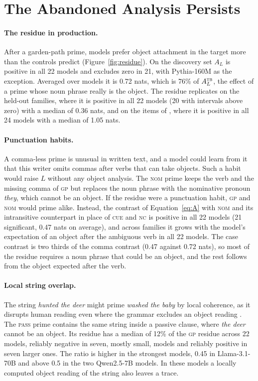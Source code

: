 \documentclass[11pt]{article}
\newcommand{\ex}[1]{\textit{#1}}
\newcommand{\cond}[1]{\textsc{#1}}
\begin{document}
\section{The Abandoned Analysis Persists}
\label{sec:residue}

\paragraph{The residue in production.}
After a garden-path prime, models prefer object attachment in the target more than the controls predict (Figure~\ref{fig:residue}).
On the discovery set $A_L$ is positive in all 22 models and excludes zero in 21, with Pythia-160M as the exception.
Averaged over models it is 0.72 nats, which is 76\% of $A_L^{\cond{tb}}$, the effect of a prime whose noun phrase really is the object.
The residue replicates on the held-out families, where it is positive in all 22 models (20 with intervals above zero) with a median of 0.36 nats, and on the items of \citet{christianson2001}, where it is positive in all 24 models with a median of 1.05 nats.

\paragraph{Punctuation habits.}
A comma-less prime is unusual in written text, and a model could learn from it that this writer omits commas after verbs that can take objects.
Such a habit would raise $L$ without any object analysis.
The \cond{nom} prime keeps the verb and the missing comma of \cond{gp} but replaces the noun phrase with the nominative pronoun \ex{they}, which cannot be an object.
If the residue were a punctuation habit, \cond{gp} and \cond{nom} would prime alike.
Instead, the contrast of Equation~\ref{eq:A} with \cond{nom} and its intransitive counterpart in place of \cond{cue} and \cond{nc} is positive in all 22 models (21 significant, 0.47 nats on average), and across families it grows with the model's expectation of an object after the ambiguous verb in all 22 models.
The case contrast is two thirds of the comma contrast (0.47 against 0.72 nats), so most of the residue requires a noun phrase that could be an object, and the rest follows from the object expected after the verb.

\paragraph{Local string overlap.}
The string \ex{hunted the deer} might prime \ex{washed the baby} by local coherence, as it disrupts human reading even where the grammar excludes an object reading \citep{tabor2004}.
The \cond{pass} prime contains the same string inside a passive clause, where \ex{the deer} cannot be an object.
Its residue has a median of 12\% of the \cond{gp} residue across 22 models, reliably negative in seven, mostly small, models and reliably positive in seven larger ones.
The ratio is higher in the strongest models, 0.45 in Llama-3.1-70B and above 0.5 in the two Qwen2.5-7B models.
In these models a locally computed object reading of the string also leaves a trace.
\end{document}

